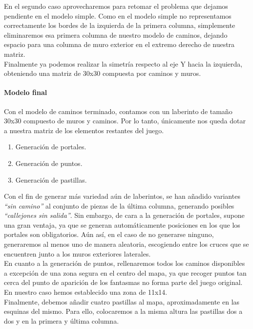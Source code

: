En el segundo caso aprovecharemos para retomar el problema que dejamos pendiente en el modelo simple. Como en el modelo simple no representamos correctamente los bordes de la izquierda de la primera columna, simplemente eliminaremos esa primera columna de nuestro modelo de caminos, dejando espacio para una columna de muro exterior en el extremo derecho de nuestra matriz.\\

Finalmente ya podemos realizar la simetría respecto al eje Y hacia la izquierda, obteniendo una matriz de 30x30 compuesta por caminos y muros.

\newpage
\paragraph{Modelo final}

Con el modelo de caminos terminado, contamos con un laberinto de tamaño 30x30 compuesto de muros y caminos. Por lo tanto, únicamente nos queda dotar a nuestra matriz de los elementos restantes del juego.

\begin{enumerate}
    \item Generación de portales.
    \item Generación de puntos.
    \item Generación de pastillas.
\end{enumerate}

Con el fin de generar más variedad aún de laberintos, se han añadido variantes \textit{``sin camino''} al conjunto de piezas de la última columna, generando posibles \textit{``callejones sin salida''}. Sin embargo, de cara a la generación de portales, supone una gran ventaja, ya que se generan automáticamente posiciones en los que los portales son obligatorios. Aún así, en el caso de no generarse ninguno, generaremos al menos uno de manera aleatoria, escogiendo entre los cruces que se encuentren junto a los muros exteriores laterales.\\

En cuanto a la generación de puntos, rellenaremos todos los caminos disponibles a excepción de una zona segura en el centro del mapa, ya que recoger puntos tan cerca del punto de aparición de los fantasmas no forma parte del juego original. En nuestro caso hemos establecido una zona de 11x14.\\

Finalmente, debemos añadir cuatro pastillas al mapa, aproximadamente en las esquinas del mismo. Para ello, colocaremos a la misma altura las pastillas dos a dos y en la primera y última columna.\\

